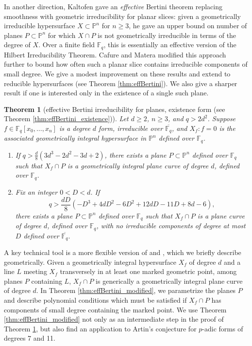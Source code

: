 \documentclass{amsart}
\newcommand{\F}{\mathbb{F}}
\renewcommand{\P}{\mathbb{P}}
\newtheorem{theoremAlph}{Theorem}
\theoremstyle{definition}
\numberwithin{equation}{section}
\numberwithin{table}{section}
\newcommand{\qbound}[1]{{\color{cyan}$q > {#1}$}}
\renewcommand{\qbound}[1]{{$q > {#1}$}}
\begin{document}
In another direction, Kaltofen \cite{Kaltofen} gave an \textit{effective} Bertini theorem replacing smoothness with geometric irreducibility for planar slices: given a geometrically irreducible hypersurface $X \subset \P^n$ for $n \geq 3$, he gave an upper bound on number of planes $P \subset \P^n$ for which $X \cap P$ is not geometrically irreducible in terms of the degree of $X$. Over a finite field $\F_q$, this is essentially an effective version of the Hilbert Irreducibility Theorem. Cafure and Matera \cite{CafureMatera} modified this approach further to bound how often such a planar slice contains irreducible components of small degree. We give a modest improvement on these results and extend to reducible hypersurfaces (see Theorem \ref{thm:effBertini}). We also give a sharper result if one is interested only in the existence of a single such plane.

\begin{theoremAlph}[effective Bertini irreducibility for planes, existence form (see Theorem \ref{thm:effBertini_existence})]
\label{thm:effBertini_intro}
	Let $d \geq 2$, $n \geq 3$, and \qbound{2d^2}. Suppose $f \in \F_q[x_0,\ldots,x_n]$ is a degree $d$ form, irreducible over $\overline{\F_q}$, and $X_f \colon f = 0$ is the associated geometrically integral hypersurface in $\P^n$ defined over $\F_q$.
	\begin{enumerate}[label = (\roman*)]
		\item If \qbound{{\frac{d}{8}\left(3d^3 - 2d^2 - 3d + 2\right)}}, there exists a plane $P \subset \P^n$ defined over $\F_q$ such that $X_f \cap P$ is a geometrically integral plane curve of degree $d$, defined over $\F_q$.
		\item Fix an integer $0 < D < d$. If  
		\[q > \frac{dD}{8}\left(-D^3 + 4dD^2 - 6D^2 + 12dD - 11D + 8d - 6\right),\] 
		there exists a plane $P \subset \P^n$ defined over $\F_q$ such that $X_f \cap P$ is a plane curve of degree $d$, defined over $\F_q$, with no irreducible components of degree at most $D$ defined over $\overline{\F_q}$.
	\end{enumerate}
\end{theoremAlph}

A key technical tool is a more flexible version of \cite[Theorem 5]{Kaltofen} and \cite[Theorem 3.3]{CafureMatera}, which we briefly describe geometrically. Given a geometrically integral hypersurface $X_f$ of degree $d$ and a line $L$ meeting $X_f$ transversely in at least one marked geometric point, among planes $P$ containing $L$, $X_f \cap P$ is generically a geometrically integral plane curve of degree $d$. In Theorem \ref{thm:effBertini_modified}, we parametrize the planes $P$ and describe polynomial conditions which must be satisfied if $X_f \cap P$ has components of small degree containing the marked point. We use Theorem \ref{thm:effBertini_modified} not only as an intermediate step in the proof of Theorem \ref{thm:effBertini_intro}, but also find an application to Artin's conjecture for $p$-adic forms of degrees 7 and 11.
\end{document}
